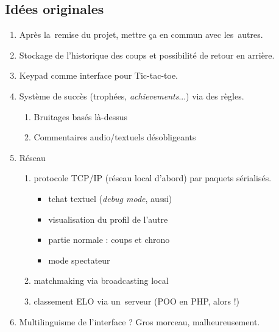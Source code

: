 \subsection{Idées originales}
\begin{enumerate}
    \item Après la~remise du projet, mettre ça en commun avec les~autres.
    \item Stockage de l'historique des coups et possibilité de retour en arrière.
    \item Keypad comme interface pour Tic-tac-toe.
    \item Système de succès (trophées, \textit{achievements}...) via des règles.
        \begin{enumerate}
            \item Bruitages basés là-dessus
            \item Commentaires audio/textuels désobligeants
        \end{enumerate}
    \item Réseau
        \begin{enumerate}
            \item protocole TCP/IP (réseau local d'abord) par paquets sérialisés.
                \begin{itemize}
                    \item tchat textuel (\textit{debug mode}, aussi)
                    \item visualisation du profil de l'autre
                    \item partie normale : coups et chrono
                    \item mode spectateur
                \end{itemize}
            \item matchmaking via broadcasting local
            \item classement ELO via un~serveur (POO en PHP, alors !)
        \end{enumerate}
	\item Multilinguisme de l'interface ? Gros morceau, malheureusement.
\end{enumerate}
